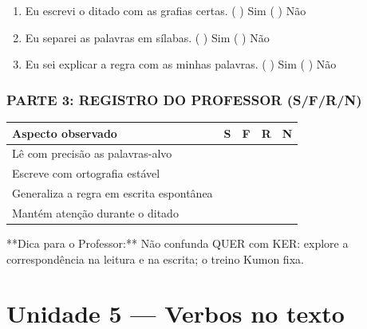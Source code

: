 \begin{exercicio}
\begin{enumerate}[label=\alph*)]
  \item Eu escrevi o ditado com as grafias certas.  \quad ( ) Sim   ( ) Não

  \item Eu separei as palavras em sílabas.  \quad ( ) Sim   ( ) Não

  \item Eu sei explicar a regra com as minhas palavras.  \quad ( ) Sim   ( ) Não

\end{enumerate}

\subsection*{PARTE 3: REGISTRO DO PROFESSOR (S/F/R/N)}

\begin{center}
\renewcommand{\arraystretch}{1.4}
\begin{tabular}{@{}p{9cm}cccc@{}}
\toprule
Aspecto observado & S & F & R & N \\
\midrule
Lê com precisão as palavras-alvo & & & & \\
Escreve com ortografia estável & & & & \\
Generaliza a regra em escrita espontânea & & & & \\
Mantém atenção durante o ditado & & & & \\
\bottomrule\end{tabular}\end{center}

\end{exercicio}

\begin{dica}
**Dica para o Professor:** Não confunda QUER com KER: explore a correspondência na leitura e na escrita; o treino Kumon fixa.
\end{dica}


\chapter{Unidade 5 --- Verbos no texto}


